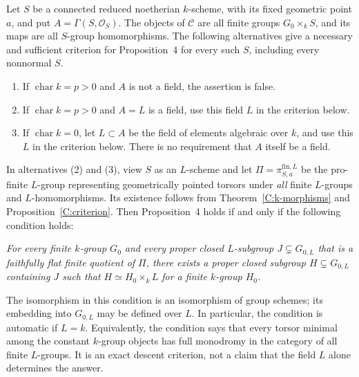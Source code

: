 \begin{theorem}
\label{C:all-constant-classification}
Let $S$ be a connected reduced noetherian $k$-scheme, with its fixed
geometric point $a$, and put $A=\Gamma(S,\mathcal O_S)$.  The objects
of $\mathcal C$ are all finite groups $G_0\times_k S$, and its maps
are all $S$-group homomorphisms.  The following alternatives give a
necessary and sufficient criterion for Proposition~4 for every such
$S$, including every nonnormal $S$.
\begin{enumerate}
\item If $\operatorname{char}k=p>0$ and $A$ is not a field, the
assertion is false.
\item If $\operatorname{char}k=p>0$ and $A=L$ is a field, use this
field $L$ in the criterion below.
\item If $\operatorname{char}k=0$, let $L\subset A$ be the field
of elements algebraic over $k$, and use this $L$ in the criterion
below.  There is no requirement that $A$ itself be a field.
\end{enumerate}
In alternatives (2) and (3), view $S$ as an $L$-scheme and let
$\Pi=\pi^{\mathrm{fin},L}_{S,a}$ be the pro-finite $L$-group
representing geometrically pointed torsors under \emph{all} finite
$L$-groups and $L$-homomorphisms.  Its existence follows from
Theorem~\ref{C:k-morphisms} and Proposition~\ref{C:criterion}.
Then Proposition~4 holds if and only if the following condition holds:

\smallskip
\noindent\emph{For every finite $k$-group $G_0$ and every proper
closed $L$-subgroup $J\subsetneq G_{0,L}$ that is a faithfully flat
finite quotient of $\Pi$, there exists a proper closed subgroup
$H\subsetneq G_{0,L}$ containing $J$ such that
$H\simeq H_0\times_k L$ for a finite $k$-group $H_0$.}
\smallskip

The isomorphism in this condition is an isomorphism of group schemes;
its embedding into $G_{0,L}$ may be defined over $L$.  In particular,
the condition is automatic if $L=k$.  Equivalently, the condition says
that every torsor minimal among the constant $k$-group objects has
full monodromy in the category of all finite $L$-groups.  It is an
exact descent criterion, not a claim that the field $L$ alone
determines the answer.
\end{theorem}

